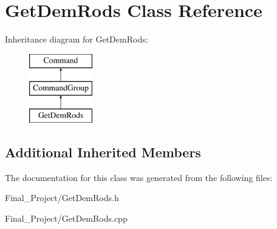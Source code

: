 \hypertarget{classGetDemRods}{\section{Get\-Dem\-Rods Class Reference}
\label{classGetDemRods}
}
Inheritance diagram for Get\-Dem\-Rods\-:\begin{figure}[H]
\begin{center}
\leavevmode
\includegraphics[height=3.000000cm]{classGetDemRods}
\end{center}
\end{figure}
\subsection*{Additional Inherited Members}


The documentation for this class was generated from the following files\-:\begin{DoxyCompactItemize}
\item 
Final\-\_\-\-Project/Get\-Dem\-Rods.\-h\item 
Final\-\_\-\-Project/Get\-Dem\-Rods.\-cpp\end{DoxyCompactItemize}

